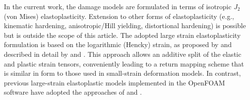 \documentclass[sn-mathphys,Numbered,draft]{sn-jnl}%
\begin{document}
In the current work, the damage models are formulated in terms of isotropic $J_2$ (von Mises) elastoplasticity.
Extension to other forms of elastoplasticity (e.g., kinematic hardening, anisotropic/Hill yielding, distortional hardening) is possible but is outside the scope of this article.
The adopted large strain elastoplasticity formulation is based on the logarithmic (Hencky) strain, as proposed by \citet{eterovic_hyperelastic-based_1990} and described in detail by \citet{koji_inelastic_2010} and \citet{de_souza_neto_computational_2008}.
This approach allows an additive split of the elastic and plastic strain tensors, conveniently leading to a return mapping scheme that is similar in form to those used in small-strain deformation models.
In contrast, previous large-strain elastoplastic models \citep{cardiff_lagrangian_2017, clancy_improving_2019} implemented in the OpenFOAM software have adopted the approaches of \citet{caminero_modeling_2011} and \citet{simo_computational_1998}.


\end{document}
